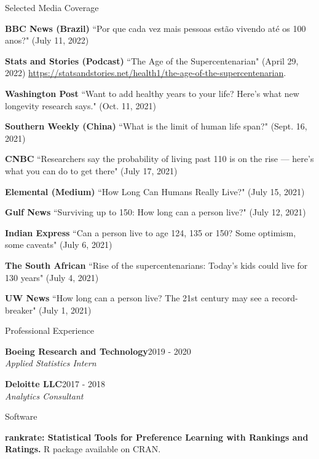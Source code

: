 \documentclass{resume} %
\begin{document}
\newpage

\begin{rSection}{Selected Media Coverage}

\small{

{\bf BBC News (Brazil)} ``Por que cada vez mais pessoas est\~{a}o vivendo at\'{e} os 100 anos?" (July 11, 2022)

{\bf Stats and Stories (Podcast)} ``The Age of the Supercentenarian" (April 29, 2022) \url{https://statsandstories.net/health1/the-age-of-the-supercentenarian}.

{\bf Washington Post} ``Want to add healthy years to your life? Here’s what new longevity research says." (Oct. 11, 2021)

{\bf Southern Weekly (China)} ``What is the limit of human life span?" (Sept. 16, 2021)

{\bf CNBC} ``Researchers say the probability of living past 110 is on the rise — here’s what you can do to get there" (July 17, 2021)

{\bf Elemental (Medium)} ``How Long Can Humans Really Live?" (July 15, 2021)

{\bf Gulf News} ``Surviving up to 150: How long can a person live?" (July 12, 2021)

{\bf Indian Express} ``Can a person live to age 124, 135 or 150? Some optimism, some caveats" (July 6, 2021)

{\bf The South African} ``Rise of the supercentenarians: Today’s kids could live for 130 years" (July 4, 2021)

{\bf UW News} ``How long can a person live? The 21st century may see a record-breaker" (July 1, 2021)
}

\end{rSection}



\begin{rSection}{Professional Experience}

{\bf Boeing Research and Technology}\hfill{2019 - 2020}
\\{\it Applied Statistics Intern}

{\bf Deloitte LLC}\hfill{2017 - 2018}
\\{\it Analytics Consultant}

\end{rSection}

\begin{rSection}{Software}

{\bf rankrate: Statistical Tools for Preference Learning with Rankings and Ratings.} R package available on CRAN.

\end{rSection}
\end{document}
